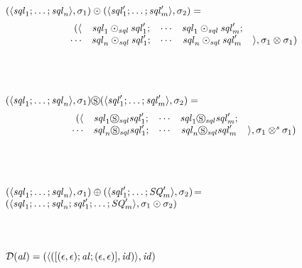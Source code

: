 \documentclass[numbers,10pt,preprint\ifanon ,nocopyrightspace\fi]{sigplanconf}
\begin{document}
\begin{definition}
  \\
  \\\ConcatDNFLens{} \OfType{}
  \ArrowTypeOf{\DNFLensType{}}{\ArrowTypeOf{\DNFLensType{}}{\DNFLensType{}}}\\
  $(\langle\mathit{sql}_1;\ldots;\mathit{sql}_n\rangle,\sigma_1)\odot(\langle\mathit{sql}_1';\ldots;\mathit{sql}_m'\rangle,\sigma_2)=$
  \[
    \begin{array}{rcccl}
      (\langle & \mathit{sql}_1\odot_{\mathit{sql}}\mathit{sql}_1'; & \cdots & \mathit{sql}_1\odot_{\mathit{sql}}\mathit{sql}_m'; \\
          \cdots    & \mathit{sql}_n\odot_{\mathit{sql}}\mathit{sql}_1'; & \cdots & \mathit{sql}_n\odot_{\mathit{sql}}\mathit{sql}_m' & \rangle,\sigma_1\otimes\sigma_1)
    \end{array}
  \]
  \\
  \\\SwapDNFLens{} \OfType{}
  \ArrowTypeOf{\DNFLensType{}}{\ArrowTypeOf{\DNFLensType{}}{\DNFLensType{}}}\\
  $(\langle\mathit{sql}_1;\ldots;\mathit{sql}_n\rangle,\sigma_1)\circledS(\langle\mathit{sql}_1';\ldots;\mathit{sql}_m'\rangle,\sigma_2)=$
  \[
    \begin{array}{rcccl}
      (\langle & \mathit{sql}_1\circledS_{\mathit{sql}}\mathit{sql}_1'; & \cdots & \mathit{sql}_1\circledS_{\mathit{sql}}\mathit{sql}_m'; \\
          \cdots    & \mathit{sql}_n\circledS_{\mathit{sql}}\mathit{sql}_1'; & \cdots & \mathit{sql}_n\circledS_{\mathit{sql}}\mathit{sql}_m' & \rangle,\sigma_1\otimes^{\mathit{s}}\sigma_1)
    \end{array}
  \]
  \\
  \\\OrDNFLens{} \OfType{}
  \ArrowTypeOf{\DNFLensType{}}{\ArrowTypeOf{\DNFLensType{}}{\DNFLensType{}}
  }\\
  $(\langle\mathit{sql}_1;\ldots;\mathit{sql}_n\rangle,\sigma_1)\oplus({\langle\mathit{sql}_1';\ldots;\mathit{SQ}_m'\rangle,\sigma_2)}$=\\
  \hspace*{2ex}$(\langle\mathit{sql}_1;\ldots;\mathit{sql}_n;
    \mathit{sql}_1';\ldots;\mathit{SQ}_m'\rangle,\sigma_1\odot\sigma_2)$\\
  \\
  \\\AtomToDNFLens{} \OfType{}
  \ArrowTypeOf{\AtomLensType{}}{\DNFLensType{}}\\
  $\mathcal{D}(\mathit{al}) = (\langle([(\epsilon,\epsilon);\mathit{al};(\epsilon,\epsilon)],\mathit{id})\rangle,\mathit{id})$
\end{definition}
\end{document}
